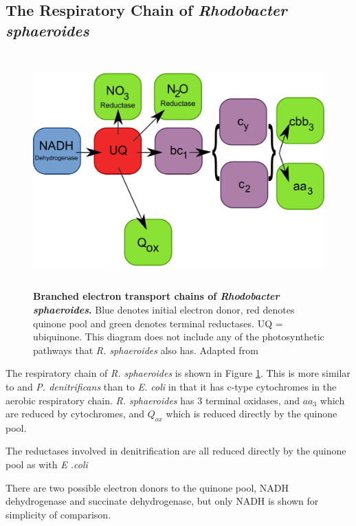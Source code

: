 \subsection{The Respiratory Chain of \textit{Rhodobacter sphaeroides}}
\begin{figure}[tbp]
\begin{center}
	\includegraphics[height=9cm]{01-introduction/data/rhodobacter_resp.pdf}
	\caption[{Branched electron transport chains of \textit{Rhodobacter sphaeroides}.}]{{\bf Branched electron transport chains of \textit{Rhodobacter sphaeroides}.} Blue denotes initial electron donor, red denotes quinone pool and green denotes terminal reductases. UQ = ubiquinone. This diagram does not include any of the photosynthetic pathways that \textit{R. sphaeroides} also has. Adapted from \citet{Ferguson1987, Daldal2001, Pappas2004}
	\label{fig:rhodobacter_resp}}
\end{center}
\end{figure}
The respiratory chain of \textit{R. sphaeroides} is shown in Figure \ref{fig:rhodobacter_resp}. This is more similar to \Nm{} and \textit{P. denitrificans} than to \textit{E. coli} in that it has c-type cytochromes in the aerobic respiratory chain. \textit{R. sphaeroides} has 3 terminal oxidases, \cbbthree{} and $aa_3$ which are reduced by cytochromes, and $Q_{ox}$ which is reduced directly by the quinone pool.

The reductases involved in denitrification are all reduced directly by the quinone pool as with \textit{E .coli}

There are two possible electron donors to the quinone pool, NADH dehydrogenase and succinate dehydrogenase, but only NADH is shown for simplicity of comparison.


